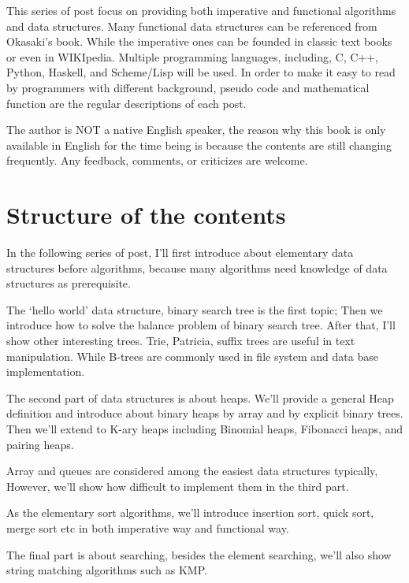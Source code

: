 \documentclass{article}
\begin{document}
This series of post focus on providing both imperative and functional
algorithms and data structures. Many functional data structures
can be referenced from Okasaki's book\cite{okasaki-book}. While
the imperative ones can be founded in classic text books \cite{CLRS}
or even in WIKIpedia.
Multiple
programming languages, including, C, C++, Python, Haskell, and
Scheme/Lisp will be used. In order to make it easy to read
by programmers with different background, pseudo code and mathematical
function are the regular descriptions of each post.

The author is NOT a native English speaker, the reason why
this book is only available in English for the time being
is because the contents are still changing frequently. Any
feedback, comments, or criticizes are welcome.

\section{Structure of the contents}
In the following series of post, I'll first introduce about
elementary data structures before algorithms, because many
algorithms need knowledge of data structures as prerequisite.

The `hello world' data structure, binary search tree is the
first topic; Then we introduce how to solve the balance problem
of binary search tree. After that, I'll show other interesting
trees. Trie, Patricia, suffix trees are useful in text manipulation.
While B-trees are commonly used in file system and data base
implementation.

The second part of data structures is about heaps. We'll
provide a general Heap definition and introduce about binary
heaps by array and by explicit binary trees. Then we'll
extend to K-ary heaps including Binomial heaps, Fibonacci
heaps, and pairing heaps.

Array and queues are considered among the easiest data structures
typically, However, we'll show how difficult to implement
them in the third part.

As the elementary sort algorithms, we'll introduce insertion
sort, quick sort, merge sort etc in both imperative way
and functional way.

The final part is about searching, besides the element
searching, we'll also show string matching algorithms
such as KMP.
\end{document}
